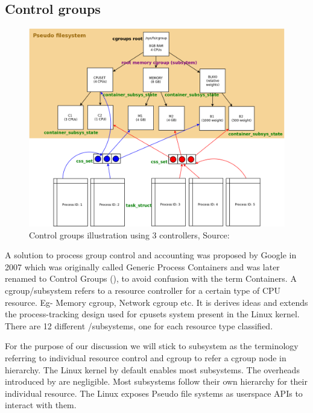     \subsection{Control groups}
      
      \begin{figure}
	\centering
	\includegraphics[width=1\textwidth]{images/background/control_groups.png}
	\caption{Control groups illustration using 3 controllers, Source:\cite{manual}}
	\label{img:cgroup}
      \end{figure}
      
      A solution to process group control and accounting was proposed by Google in 2007 which was originally called Generic Process 
Containers \cite{menage2007adding} and was later renamed to Control Groups (\cg{}), to avoid confusion with the term Containers. A 
cgroup/subsystem refers to a resource controller for a certain type of CPU resource. Eg- Memory cgroup, Network cgroup etc. It is derives 
ideas and extends the process-tracking design used for cpusets system present in the Linux kernel. There are 12 different 
\cg{}/subsystems, one for each resource type classified.

      For the purpose of our discussion we will stick to subsystem as the terminology referring to individual resource control and cgroup 
to refer a cgroup node in hierarchy. The Linux kernel by default enables most subsystems. The overheads introduced by \cg{} are 
negligible. Most subsystems follow their own hierarchy for their individual resource. The Linux exposes Pseudo file systems as userspace 
APIs to interact with them.

